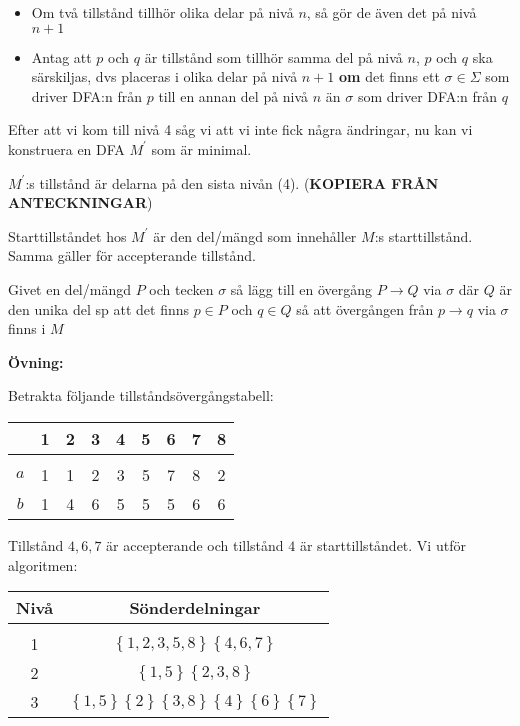\begin{itemize}
  \item Om två tillstånd tillhör olika delar på nivå $n$, så gör de även det på nivå $n+1$
  \item Antag att $p$ och $q$ är tillstånd som tillhör samma del på nivå $n$, $p$ och $q$ ska särskiljas, dvs placeras i olika delar på nivå $n+1$ \textbf{om} det finns ett $\sigma\in\Sigma$ som driver DFA:n från $p$ till en annan del på nivå $n$ än $\sigma$ som driver DFA:n från $q$ 
\end{itemize}
\par\bigskip
\noindent Efter att vi kom till nivå 4 såg vi att vi inte fick några ändringar, nu kan vi konstruera en DFA $M^{\prime}$ som är minimal.\par
\noindent $M^{\prime}$:s tillstånd är delarna på den sista nivån (4). (\textbf{KOPIERA FRÅN ANTECKNINGAR})\par
\noindent Starttillståndet hos $M^{\prime}$ är den del/mängd som innehåller $M$:s starttillstånd. Samma gäller för accepterande tillstånd.\par
\noindent Givet en del/mängd $P$ och tecken $\sigma$ så lägg till en övergång $P\to Q$ via $\sigma$ där $Q$ är den unika del sp att det finns $p\in P$ och $q\in Q$ så att övergången från $p\to q$ via $\sigma$ finns i $M$ 
\par\bigskip
\noindent\textbf{Övning:}\par
\noindent Betrakta följande tillståndsövergångstabell:
\par\bigskip
\begin{center}
  \begin{tabular}{c|c|c|c|c|c|c|c|c|}
    &1&2&3&4&5&6&7&8\\
    \hline\\
    $a$&1&1&2&3&5&7&8&2\\
    $b$&1&4&6&5&5&5&6&6
  \end{tabular}
\end{center}
\par\bigskip
\noindent Tillstånd $4,6,7$ är accepterande och tillstånd $4$ är starttillståndet. Vi utför algoritmen:
\par\bigskip
\begin{center}
  \begin{tabular}{c|c}
    Nivå&Sönderdelningar\\
    \hline\\
  1&$\left\{1,2,3,5,8\right\}\left\{4,6,7\right\}$\\
  2&$\left\{1,5\right\}\left\{2,3,8\right\}$\\
3&$\left\{1,5\right\}\left\{2\right\}\left\{3,8\right\}\left\{4\right\}\left\{6\right\}\left\{7\right\}$
  \end{tabular}
\end{center}
